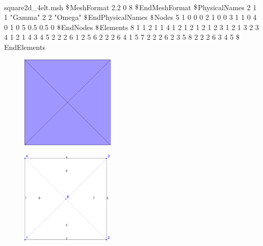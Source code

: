 \documentclass[english,10pt,a4paper]{article}
\newcommand{\dollar}{\mbox{\textdollar}}
\begin{document}
\paragraph{}
\begin{minipage}[c]{0.4\linewidth}

\begin{mycpplistingInTabular}{square2d\_4elt.msh}
$\dollar$MeshFormat
2.2 0 8
$\dollar$EndMeshFormat
$\dollar$PhysicalNames
2
1 1 "Gamma"
2 2 "Omega"
$\dollar$EndPhysicalNames
$\dollar$Nodes
5
1 0 0 0
2 1 0 0
3 1 1 0
4 0 1 0
5 0.5 0.5 0
$\dollar$EndNodes
$\dollar$Elements
8
1 1 2 1 1 4 1
2 1 2 1 2 1 2
3 1 2 1 3 2 3
4 1 2 1 4 3 4
5 2 2 2 6 1 2 5
6 2 2 2 6 4 1 5
7 2 2 2 6 2 3 5
8 2 2 2 6 3 4 5
$\dollar$EndElements
\end{mycpplistingInTabular}

\end{minipage} \hfill
\begin{minipage}[c]{0.6\linewidth}
\begin{figure}[H]
  \centering
  \includegraphics[width=0.4\textwidth]{images/square2d_4elt.png}
\end{figure}
\begin{figure}[H]
  \centering
  \vspace*{-0.05\textwidth}
  \includegraphics[width=0.4\textwidth]{images/square2d_4elt_numbering.png}
\end{figure}
\end{minipage}
\end{document}

